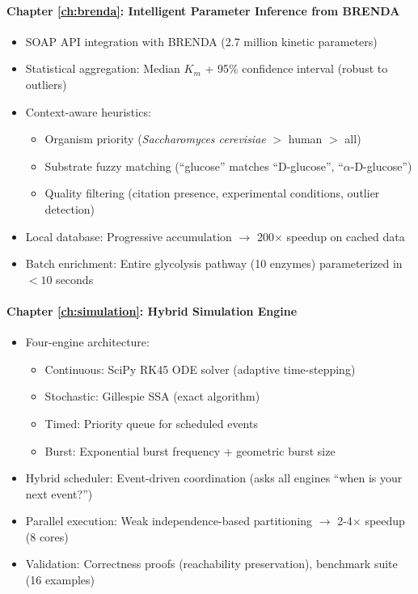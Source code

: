 \paragraph{Chapter \ref{ch:brenda}: Intelligent Parameter Inference from BRENDA}
\begin{itemize}
    \item SOAP API integration with BRENDA (2.7 million kinetic parameters)
    \item Statistical aggregation: Median $K_m$ + 95\% confidence interval (robust to outliers)
    \item Context-aware heuristics:
    \begin{itemize}
        \item Organism priority (\emph{Saccharomyces cerevisiae} $>$ human $>$ all)
        \item Substrate fuzzy matching (``glucose'' matches ``D-glucose'', ``$\alpha$-D-glucose'')
        \item Quality filtering (citation presence, experimental conditions, outlier detection)
    \end{itemize}
    \item Local database: Progressive accumulation $\to$ 200$\times$ speedup on cached data
    \item Batch enrichment: Entire glycolysis pathway (10 enzymes) parameterized in $<10$ seconds
\end{itemize}

\paragraph{Chapter \ref{ch:simulation}: Hybrid Simulation Engine}
\begin{itemize}
    \item Four-engine architecture:
    \begin{itemize}
        \item Continuous: SciPy RK45 ODE solver (adaptive time-stepping)
        \item Stochastic: Gillespie SSA (exact algorithm)
        \item Timed: Priority queue for scheduled events
        \item Burst: Exponential burst frequency + geometric burst size
    \end{itemize}
    \item Hybrid scheduler: Event-driven coordination (asks all engines ``when is your next event?'')
    \item Parallel execution: Weak independence-based partitioning $\to$ 2-4$\times$ speedup (8 cores)
    \item Validation: Correctness proofs (reachability preservation), benchmark suite (16 examples)
\end{itemize}

